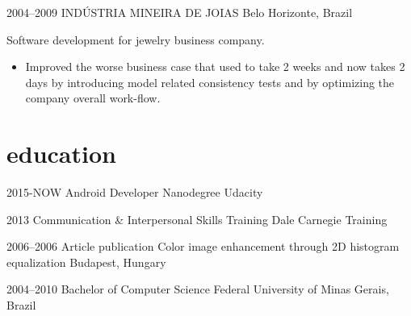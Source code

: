 \documentclass[]{friggeri-cv}
\begin{document}
\begin{entrylist}

 \entry
 {2004--2009}
 {INDÚSTRIA MINEIRA DE JOIAS}
 {Belo Horizonte, Brazil}
 { Software development for jewelry business company.
  \begin{itemize}
    \item Improved the worse business case that used to take 2 weeks and now takes 2 days by introducing model related consistency tests and by optimizing the company overall work-flow.
  \end{itemize} }


\end{entrylist}

\section{education}

\begin{entrylist}
\entry
{2015-NOW}
{Android {\normalfont Developer Nanodegree}}
{Udacity}


\entry
{2013}
{Communication \& Interpersonal {\normalfont Skills Training}}
{Dale Carnegie Training}


\entry
{2006--2006}
{Article publication {\normalfont Color image enhancement through 2D histogram equalization}}
{Budapest, Hungary}


\entry
{2004--2010}
{{\normalfont Bachelor of} Computer Science}
{Federal University of Minas Gerais, Brazil}

\end{entrylist}
\end{document}
